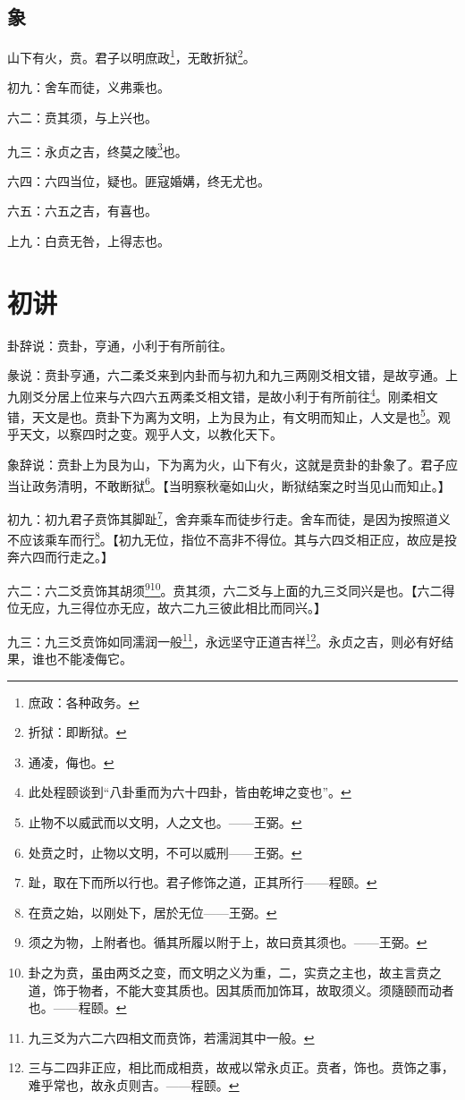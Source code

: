 \documentclass[12pt,oneside]{book}
\begin{document}
\subsection{象}
山下有火，贲。君子以明庶政\footnote{庶政：各种政务。}，无敢折狱\footnote{折狱：即断狱。}。

初九：舍车而徒，义弗乘也。

六二：贲其须，与上兴也。

九三：永贞之吉，终莫之陵\footnote{通凌，侮也。}也。

六四：六四当位，疑也。匪寇婚媾，终无尤也。

六五：六五之吉，有喜也。

上九：白贲无咎，上得志也。


\section{初讲}
卦辞说：贲卦，亨通，小利于有所前往。

彖说：贲卦亨通，六二柔爻来到内卦而与初九和九三两刚爻相文错，是故亨通。上九刚爻分居上位来与六四六五两柔爻相文错，是故小利于有所前往\footnote{此处程颐谈到“八卦重而为六十四卦，皆由乾坤之变也”。}。刚柔相文错，天文是也。贲卦下为离为文明，上为艮为止，有文明而知止，人文是也\footnote{止物不以威武而以文明，人之文也。——王弼。}。观乎天文，以察四时之变。观乎人文，以教化天下。

象辞说：贲卦上为艮为山，下为离为火，山下有火，这就是贲卦的卦象了。君子应当让政务清明，不敢断狱\footnote{处贲之时，止物以文明，不可以威刑——王弼。}。【当明察秋毫如山火，断狱结案之时当见山而知止。】


初九：初九君子贲饰其脚趾\footnote{趾，取在下而所以行也。君子修饰之道，正其所行——程颐。}，舍弃乘车而徒步行走。舍车而徒，是因为按照道义不应该乘车而行\footnote{在贲之始，以刚处下，居於无位——王弼。}。【初九无位，指位不高非不得位。其与六四爻相正应，故应是投奔六四而行走之。】

六二：六二爻贲饰其胡须\footnote{须之为物，上附者也。循其所履以附于上，故曰贲其须也。——王弼。}\footnote{卦之为贲，虽由两爻之变，而文明之义为重，二，实贲之主也，故主言贲之道，饰于物者，不能大变其质也。因其质而加饰耳，故取须义。须隨颐而动者也。——程颐。}。贲其须，六二爻与上面的九三爻同兴是也。【六二得位无应，九三得位亦无应，故六二九三彼此相比而同兴。】

九三：九三爻贲饰如同濡润一般\footnote{九三爻为六二六四相文而贲饰，若濡润其中一般。}，永远坚守正道吉祥\footnote{三与二四非正应，相比而成相贲，故戒以常永贞正。贲者，饰也。贲饰之事，难乎常也，故永贞则吉。——程颐。}。永贞之吉，则必有好结果，谁也不能凌侮它。
\end{document}
